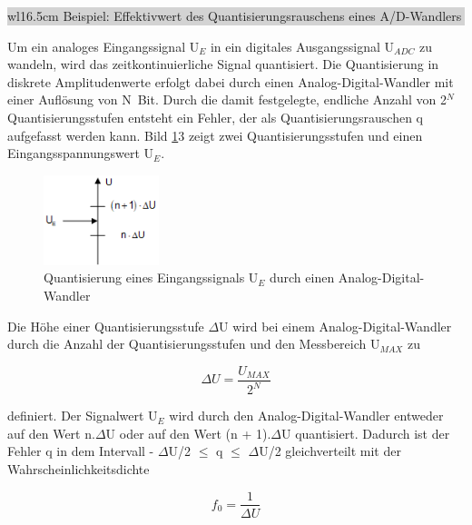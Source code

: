 \noindent
\colorbox{lightgray}{%
%
\renewcommand\arraystretch{0.6}%
\begin{tabular}{ wl{16.5cm} }
{\selectfont
\noindent
Beispiel: Effektivwert des Quantisierungsrauschens eines A/D-Wandlers}
\end{tabular}%
}\bigskip

\noindent Um ein analoges Eingangssignal U$_{E}$ in ein digitales Ausgangssignal U$_{ADC}$ zu wandeln, wird das zeitkontinuierliche Signal quantisiert. Die Quantisierung in diskrete Amplitudenwerte erfolgt dabei durch einen Analog-Digital-Wandler mit einer Aufl\"{o}sung von N~Bit. Durch die damit festgelegte, endliche Anzahl von 2$^{N}$ Quantisierungsstufen entsteht ein Fehler, der als Quantisierungsrauschen q aufgefasst werden kann. Bild \ref{fig:GleichverteilungADC}3 zeigt zwei Quantisierungsstufen und einen Eingangsspannungswert U$_{E}$.

\noindent 

\begin{figure}[H]
  \centerline{\includegraphics[width=0.3\textwidth]{Kapitel4/Bilder/image23}}
  \caption{Quantisierung eines Eingangssignals U$_{E}$ durch einen Analog-Digital-Wandler}
  \label{fig:GleichverteilungADC}
\end{figure}

\noindent Die H\"{o}he einer Quantisierungsstufe $\Delta$U wird bei einem Analog-Digital-Wandler durch die Anzahl der Quantisierungsstufen und den Messbereich U$_{MAX}$ zu 

\begin{equation}\label{eq:fourhundredsixtynine}
\Delta U=\dfrac{U_{MAX} }{2^{N}}
\end{equation}

\noindent definiert. Der Signalwert U$_{E}$ wird durch den Analog-Digital-Wandler entweder auf den Wert n$.\Delta$U oder auf den Wert (n + 1)$.\Delta$U quantisiert. Dadurch ist der Fehler q in dem Intervall - $\Delta$U/2 $\mathrm{\le}$ q $\mathrm{\le}$ $\Delta$U/2 gleichverteilt mit der Wahrscheinlichkeitsdichte

\begin{equation}\label{eq:fourhundredseventy}
f_{0} =\dfrac{1}{\Delta U}
\end{equation}

